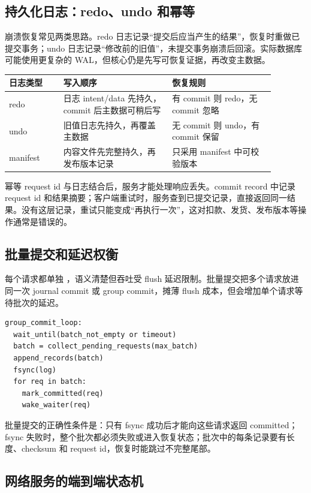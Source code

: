 \subsection{持久化日志：redo、undo 和幂等}

崩溃恢复常见两类思路。redo 日志记录“提交后应当产生的结果”，恢复时重做已提交事务；undo 日志记录“修改前的旧值”，未提交事务崩溃后回滚。实际数据库可能使用更复杂的 WAL，但核心仍是先写可恢复证据，再改变主数据。

\begin{longtable}{|p{0.18\linewidth}|p{0.36\linewidth}|p{0.34\linewidth}|}
\toprule
日志类型 & 写入顺序 & 恢复规则 \\
\midrule
redo & 日志 intent/data 先持久，commit 后主数据可稍后写 & 有 commit 则 redo，无 commit 忽略 \\\tablerowrule
undo & 旧值日志先持久，再覆盖主数据 & 无 commit 则 undo，有 commit 保留 \\\tablerowrule
manifest & 内容文件先完整持久，再发布版本记录 & 只采用 manifest 中可校验版本 \\
\bottomrule
\end{longtable}

幂等 request id 与日志结合后，服务才能处理响应丢失。commit record 中记录 request id 和结果摘要；客户端重试时，服务查到已提交记录，直接返回同一结果。没有这层记录，重试只能变成“再执行一次”，这对扣款、发货、发布版本等操作通常是错误的。

\subsection{批量提交和延迟权衡}

每个请求都单独 ，语义清楚但吞吐受 flush 延迟限制。批量提交把多个请求放进同一次 journal commit 或 group commit，摊薄 flush 成本，但会增加单个请求等待批次的延迟。

\begin{lstlisting}
group_commit_loop:
  wait_until(batch_not_empty or timeout)
  batch = collect_pending_requests(max_batch)
  append_records(batch)
  fsync(log)
  for req in batch:
    mark_committed(req)
    wake_waiter(req)
\end{lstlisting}

批量提交的正确性条件是：只有 fsync 成功后才能向这些请求返回 committed；fsync 失败时，整个批次都必须失败或进入恢复状态；批次中的每条记录要有长度、checksum 和 request id，恢复时能跳过不完整尾部。

\subsection{网络服务的端到端状态机}


